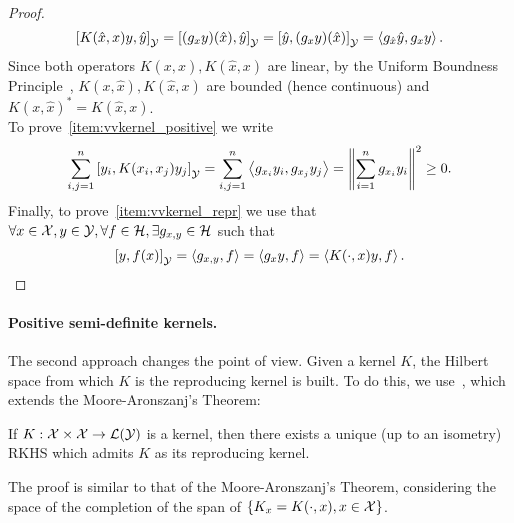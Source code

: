 \begin{proof}
\begin{equation}
        \nonumber
        \left[ K(\hat{x}, x) y,  \hat{y} \right]_\mathcal{Y} = \left[ (g_{x} y)(\hat{x}), \hat{y} \right]_\mathcal{Y} = \left[ \hat{y}, (g_{x} y)(\hat{x}) \right]_\mathcal{Y} = \left\langle g_{\hat{x}} \hat{y}, g_x y \right\rangle.
    \end{equation}
    Since both operators $K(x, \hat{x}), K(\hat{x}, x)$ are linear, by the Uniform Boundness Principle~\citep{Akhiezer1961TheoryOL}, $K(x, \hat{x}), K(\hat{x}, x)$ are bounded (hence continuous) and $K(x, \hat{x})^* = K(\hat{x}, x)$.
    \\
    To prove~\ref{item:vvkernel_positive} we write
    \begin{equation}
        \nonumber
        \sum_{i, j =1}^n \left[ y_i, K(x_i, x_j) y_j \right]_\mathcal{Y} = \sum_{i, j =1}^n \left\langle g_{x_i} y_i, g_{x_j} y_j \right\rangle  = \left\lVert\sum_{i=1}^n g_{x_i} y_i\right\rVert^2 \geq 0 .
    \end{equation}
    Finally, to prove~\ref{item:vvkernel_repr} we use that 
    $\forall x \in \mathcal{X}, y \in \mathcal{Y}, \forall f \in \mathcal{H}, \exists g_{x, y} \in \mathcal{H}$ such that 
    $$ \left[ y, f(x) \right]_\mathcal{Y} = \left\langle g_{x, y}, f \right\rangle = \left\langle g_{x} y, f \right\rangle =\left\langle K(\cdot, x) y, f \right\rangle.$$
\end{proof}
\paragraph*{Positive semi-definite kernels.}
The second approach changes the point of view. Given a kernel $K$, the Hilbert space from which $K$ is the reproducing kernel is built.
To do this, we use~\citet[Theorem 2.1]{MicchelliP05}, which extends the Moore-Aronszanj's Theorem:
\begin{theorem}\label{th:moore-arons_vector}
    If $K: \mathcal{X} \times \mathcal{X} \to \mathcal{L}(\mathcal{Y})$ is a kernel, then there exists a unique (up to an isometry) RKHS which admits $K$ as its reproducing kernel. 
\end{theorem}
The proof is similar to that of the Moore-Aronszanj's Theorem, considering the space of the completion of the span of $\left\lbrace K_x = K(\cdot, x) , x \in \mathcal{X} \right\rbrace$.

